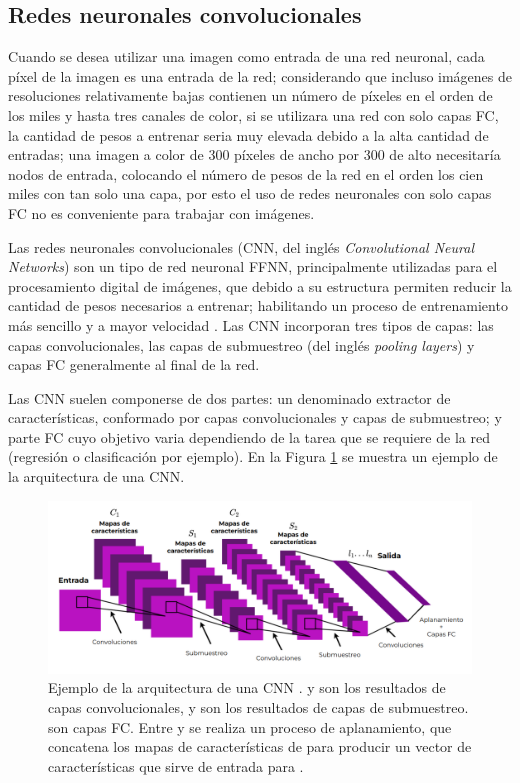 \subsection{Redes neuronales convolucionales}

Cuando se desea utilizar una imagen como entrada de una red neuronal, cada píxel de la imagen es una entrada de la red; considerando que incluso imágenes de resoluciones relativamente bajas contienen un número de píxeles en el orden de los miles y hasta tres canales de color, si se utilizara una red con solo capas FC, la cantidad de pesos a entrenar seria muy elevada debido a la alta cantidad de entradas; una imagen a color de 300 píxeles de ancho por 300 de alto necesitaría  nodos de entrada, colocando el número de pesos de la red en el orden los cien miles con tan solo una capa, por esto el uso de redes neuronales con solo capas FC no es conveniente para trabajar con imágenes.

Las redes neuronales convolucionales (CNN, del inglés \textit{Convolutional Neural Networks}) son un tipo de red neuronal FFNN, principalmente utilizadas para el procesamiento digital de imágenes, que debido a su estructura permiten reducir la cantidad de pesos necesarios a entrenar; habilitando un proceso de entrenamiento más sencillo y a mayor velocidad \cite{Lecun2010}. Las CNN incorporan tres tipos de capas: las capas convolucionales, las capas de submuestreo (del inglés \textit{pooling layers}) y capas FC generalmente al final de la red.

Las CNN suelen componerse de dos partes: un denominado extractor de características, conformado por capas convolucionales y capas de submuestreo; y parte FC cuyo objetivo varia dependiendo de la tarea que se requiere de la red (regresión o clasificación por ejemplo). En la Figura \ref{fig:cnn-sample} se muestra un ejemplo de la arquitectura de una CNN.

\begin{figure}[H]
    \centering
    \includegraphics[scale=0.35]{partes/img/CNN-sample.png}
    \caption[Ejemplo de la arquitectura de una CNN.]{
        Ejemplo de la arquitectura de una CNN \cite{Lecun2010}.  y  son los resultados de capas convolucionales,  y  son los resultados de capas de submuestreo.  son  capas FC. Entre  y  se realiza un proceso de aplanamiento, que concatena los mapas de características de  para producir un vector de características que sirve de entrada para .
    } 
    \label{fig:cnn-sample}
\end{figure}


